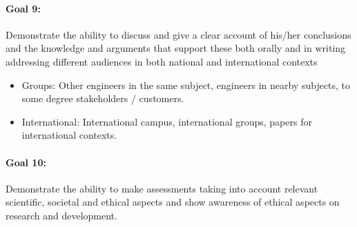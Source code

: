% 
% 

\paragraph{Goal 9:} Demonstrate the ability to discuss and give a
clear account of his/her conclusions and the knowledge and arguments
that support these both orally and in writing addressing different
audiences in both national and international contexts
\begin{itemize}
\item Groups: Other engineers in the same subject, engineers in nearby
  subjects, to some degree stakeholders / customers.
\item International: International campus, international groups,
  papers for international contexts.
\end{itemize}
% 
%
% 
% 

\paragraph{Goal 10:} Demonstrate the ability to make assessments
taking into account relevant scientific, societal and ethical aspects
and show awareness of ethical aspects on research and development.

